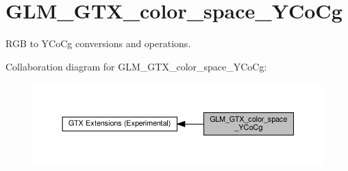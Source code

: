 \hypertarget{group__gtx__color__space___y_co_cg}{}\section{G\+L\+M\+\_\+\+G\+T\+X\+\_\+color\+\_\+space\+\_\+\+Y\+Co\+Cg}
\label{group__gtx__color__space___y_co_cg}


R\+GB to Y\+Co\+Cg conversions and operations.  


Collaboration diagram for G\+L\+M\+\_\+\+G\+T\+X\+\_\+color\+\_\+space\+\_\+\+Y\+Co\+Cg\+:\nopagebreak
\begin{figure}[H]
\begin{center}
\leavevmode
\includegraphics[width=350pt]{group__gtx__color__space___y_co_cg}
\end{center}
\end{figure}
